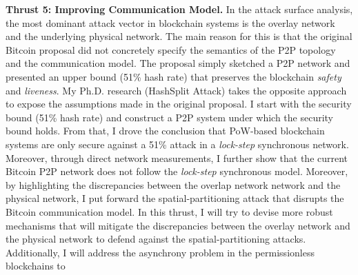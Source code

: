 \documentclass{NSF}
\newcommand{\BfPara}[1]{{\noindent\textbf{#1.}}\xspace}
\begin{document}
\BfPara{Thrust 5: Improving Communication Model} In the attack surface analysis, the most dominant attack vector in blockchain systems is the overlay network and the underlying physical network. The main reason for this is that the original Bitcoin proposal did not concretely specify the semantics of the P2P topology and the communication model. The proposal simply sketched a P2P network and presented an upper bound (51\% hash rate) that preserves the blockchain {\em safety} and {\em liveness}. My Ph.D. research (HashSplit Attack) takes the opposite approach to expose the assumptions made in the original proposal. I start with the security bound (51\% hash rate) and construct a P2P system under which the security bound holds. From that, I drove the conclusion that PoW-based blockchain systems are only secure against a 51\% attack in a {\em lock-step} synchronous network. Moreover, through direct network measurements, I further show that the current Bitcoin P2P network does not follow the {\em lock-step} synchronous model. Moreover, by highlighting the discrepancies between the overlap network network and the physical network, I put forward the spatial-partitioning attack that disrupts the Bitcoin communication model. In this thrust, I will try to devise more robust mechanisms that will mitigate the discrepancies between the overlay network and the physical network to defend against the spatial-partitioning attacks. Additionally, I will address the asynchrony problem in the permissionless blockchains to 






\end{document}
